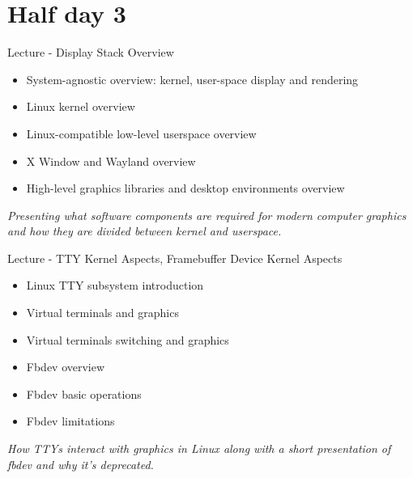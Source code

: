 \documentclass[a4paper,12pt,obeyspaces,spaces,hyphens]{article}
\begin{document}
\section{Half day 3}

\feagendatwocolumn
{Lecture - Display Stack Overview}
{
  \begin{itemize}
  \item System-agnostic overview: kernel, user-space display and rendering
  \item Linux kernel overview
  \item Linux-compatible low-level userspace overview
  \item X Window and Wayland overview
  \item High-level graphics libraries and desktop environments overview
  \end{itemize}
  \vspace{0.5em}
  {\em Presenting what software components are required for modern computer graphics and how they are divided between kernel and userspace.}
}
{Lecture - TTY Kernel Aspects, Framebuffer Device Kernel Aspects}
{
  \begin{itemize}
  \item Linux TTY subsystem introduction
  \item Virtual terminals and graphics
  \item Virtual terminals switching and graphics
  \end{itemize}
  \vspace{0.5em}
  \begin{itemize}
  \item Fbdev overview
  \item Fbdev basic operations
  \item Fbdev limitations
  \end{itemize}
  \vspace{0.5em}
  {\em How TTYs interact with graphics in Linux along with a short presentation of fbdev and why it's deprecated.}
}
\\
\end{document}
